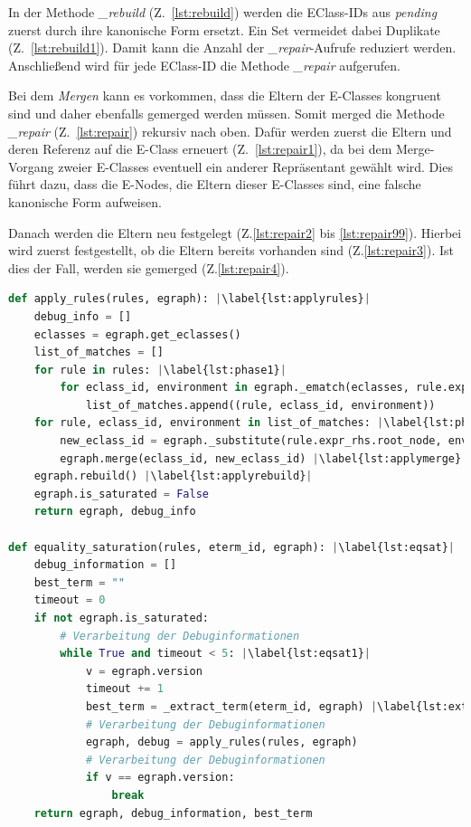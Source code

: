 In der Methode \textit{\_rebuild} (Z.~\ref{lst:rebuild}) werden die EClass-IDs aus \textit{pending} zuerst durch ihre kanonische Form ersetzt. Ein Set vermeidet dabei Duplikate (Z.~\ref{lst:rebuild1}).  
Damit kann die Anzahl der \textit{\_repair}-Aufrufe reduziert werden.
Anschließend wird für jede EClass-ID die Methode \textit{\_repair} aufgerufen.

Bei dem \textit{Mergen} kann es vorkommen, dass die Eltern der E-Classes kongruent sind und daher ebenfalls gemerged werden müssen. Somit merged die Methode \textit{\_repair} (Z.~\ref{lst:repair}) 
rekursiv nach oben. Dafür werden zuerst die Eltern und deren Referenz auf die E-Class erneuert (Z.~\ref{lst:repair1}), da bei dem Merge-Vorgang zweier E-Classes eventuell ein anderer Repräsentant
gewählt wird. Dies führt dazu, dass die E-Nodes, die Eltern dieser E-Classes sind, eine falsche kanonische Form aufweisen.

Danach werden die Eltern neu festgelegt (Z.\ref{lst:repair2} bis \ref{lst:repair99}). Hierbei wird zuerst festgestellt, ob die Eltern bereits vorhanden sind (Z.\ref{lst:repair3}). Ist dies der Fall, werden sie
gemerged (Z.\ref{lst:repair4}).

\begin{lstlisting}[language=Python, escapechar=|, caption=\textit{apply\_rules}- und \textit{equality\_saturation}-Funktion, label={lst:methods3}]
def apply_rules(rules, egraph): |\label{lst:applyrules}|
    debug_info = []
    eclasses = egraph.get_eclasses()
    list_of_matches = []
    for rule in rules: |\label{lst:phase1}|
        for eclass_id, environment in egraph._ematch(eclasses, rule.expr_lhs.root_node):
            list_of_matches.append((rule, eclass_id, environment))
    for rule, eclass_id, environment in list_of_matches: |\label{lst:phase2}|
        new_eclass_id = egraph._substitute(rule.expr_rhs.root_node, environment)
        egraph.merge(eclass_id, new_eclass_id) |\label{lst:applymerge}|
    egraph.rebuild() |\label{lst:applyrebuild}|
    egraph.is_saturated = False
    return egraph, debug_info

def equality_saturation(rules, eterm_id, egraph): |\label{lst:eqsat}|
    debug_information = []
    best_term = ""
    timeout = 0
    if not egraph.is_saturated:
        # Verarbeitung der Debuginformationen
        while True and timeout < 5: |\label{lst:eqsat1}|
            v = egraph.version
            timeout += 1
            best_term = _extract_term(eterm_id, egraph) |\label{lst:extract}|
            # Verarbeitung der Debuginformationen
            egraph, debug = apply_rules(rules, egraph)
            # Verarbeitung der Debuginformationen
            if v == egraph.version:
                break
    return egraph, debug_information, best_term
\end{lstlisting} 

